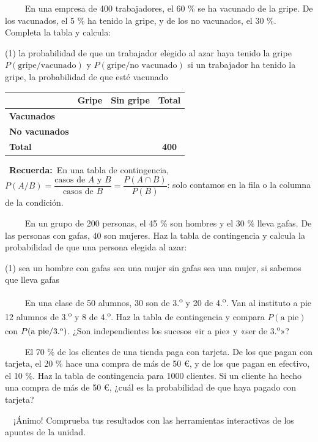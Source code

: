 \documentclass[11pt,a4paper]{article}
\newcommand{\estrelles}[1]{{\color{accent}\ifcase#1\or\faStar\faStar[regular]\faStar[regular]\or\faStar\faStar\faStar[regular]\or\faStar\faStar\faStar\fi}}
\newcounter{exer}
\newcommand{\ex}[1]{\par\needspace{4\baselineskip}\medskip\stepcounter{exer}\noindent{\color{navy}\bfseries\theexer.}\ \ {\small\estrelles{#1}}\ \ }
\newcommand{\recorda}[1]{\par\smallskip\begin{tcolorbox}[colback=accent!7,colframe=accent!55,arc=2mm,boxrule=0.5pt,left=2.5mm,right=2.5mm,top=1mm,bottom=1mm]\small{\color{accent}\faLightbulb[regular]}\ \textbf{Recuerda:}\ #1\end{tcolorbox}}
\begin{document}
\ex{2} En una empresa de 400 trabajadores, el 60 \% se ha vacunado de la gripe. De los vacunados, el 5 \% ha tenido la gripe, y de los no vacunados, el 30 \%. Completa la tabla y calcula:
\begin{tasks}(1)
  \task la probabilidad de que un trabajador elegido al azar haya tenido la gripe
  \task $P(\text{gripe}/\text{vacunado})$ y $P(\text{gripe}/\text{no vacunado})$
  \task si un trabajador ha tenido la gripe, la probabilidad de que esté vacunado
\end{tasks}
\par\smallskip\begin{center}{\small\renewcommand{\arraystretch}{1.3}\begin{tabular}{l|cc|c}
\rowcolor{soft} & Gripe & Sin gripe & Total\\\hline
\cellcolor{soft}\textbf{Vacunados} & \phantom{000} & \phantom{000} & \phantom{000}\\
\cellcolor{soft}\textbf{No vacunados} & \phantom{000} & \phantom{000} & \phantom{000}\\\hline
\cellcolor{soft}\textbf{Total} & \phantom{000} & \phantom{000} & \textbf{400}\\
\end{tabular}}\end{center}\recorda{En una tabla de contingencia, $P(A/B)=\dfrac{\text{casos de }A\text{ y }B}{\text{casos de }B}=\dfrac{P(A\cap B)}{P(B)}$: solo contamos en la fila o la columna de la condición.}

\ex{3} En un grupo de 200 personas, el 45 \% son hombres y el 30 \% lleva gafas. De las personas con gafas, 40 son mujeres. Haz la tabla de contingencia y calcula la probabilidad de que una persona elegida al azar:
\begin{tasks}(1)
  \task sea un hombre con gafas
  \task sea una mujer sin gafas
  \task sea una mujer, si sabemos que lleva gafas
\end{tasks}

\ex{3} En una clase de 50 alumnos, 30 son de 3.\textsuperscript{o} y 20 de 4.\textsuperscript{o}. Van al instituto a pie 12 alumnos de 3.\textsuperscript{o} y 8 de 4.\textsuperscript{o}. Haz la tabla de contingencia y compara $P(\text{a pie})$ con $P(\text{a pie}/\text{3.\textsuperscript{o}})$. ¿Son independientes los sucesos «ir a pie» y «ser de 3.\textsuperscript{o}»?

\ex{3} El 70 \% de los clientes de una tienda paga con tarjeta. De los que pagan con tarjeta, el 20 \% hace una compra de más de 50 €, y de los que pagan en efectivo, el 10 \%. Haz la tabla de contingencia para 1000 clientes. Si un cliente ha hecho una compra de más de 50 €, ¿cuál es la probabilidad de que haya pagado con tarjeta?

\vfill
\begin{center}\color{muted}\small\faCheckCircle[regular]\ \ ¡Ánimo! Comprueba tus resultados con las herramientas interactivas de los apuntes de la unidad.\end{center}
\end{document}
